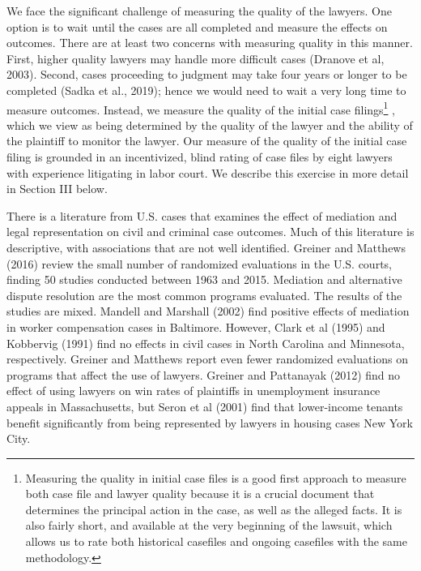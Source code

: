 \documentclass[oneside,12pt]{article}
\begin{document}
We face the significant challenge of measuring the quality of the lawyers. One option is to wait until the cases are all completed and measure the effects on outcomes. There are at least two concerns with measuring quality in this manner. First, higher quality lawyers may handle more difficult cases (Dranove et al, 2003). Second, cases proceeding to judgment may take four years or longer to be completed (Sadka et al., 2019); hence we would need to wait a very long time to measure outcomes. Instead, we measure the quality of the initial case filings\footnote{Measuring the quality in initial case files is a good first approach to measure both case file and lawyer quality because it is a crucial document that determines the principal action in the case, as well as the alleged facts. It is also fairly short, and available at the very beginning of the lawsuit, which allows us to rate both historical casefiles and ongoing casefiles with the same methodology.} , which we view as being determined by the quality of the lawyer and the ability of the plaintiff to monitor the lawyer. Our measure of the quality of the initial case filing is grounded in an incentivized, blind rating of case files by eight lawyers with experience litigating in labor court. We describe this exercise in more detail in Section III below. 

There is a literature from U.S. cases that examines the effect of mediation and legal representation on civil and criminal case outcomes. Much of this literature is descriptive, with associations that are not well identified. Greiner and Matthews (2016) review the small number of randomized evaluations in the U.S. courts, finding 50 studies conducted between 1963 and 2015. Mediation and alternative dispute resolution are the most common programs evaluated. The results of the studies are mixed. Mandell and Marshall (2002) find positive effects of mediation in worker compensation cases in Baltimore. However, Clark et al (1995) and Kobbervig (1991) find no effects in civil cases in North Carolina and Minnesota, respectively. Greiner and Matthews report even fewer randomized evaluations on programs that affect the use of lawyers. Greiner and Pattanayak (2012) find no effect of using lawyers on win rates of plaintiffs in unemployment insurance appeals in Massachusetts, but Seron et al (2001) find that lower-income tenants benefit significantly from being represented by lawyers in housing cases New York City. 
\end{document}
